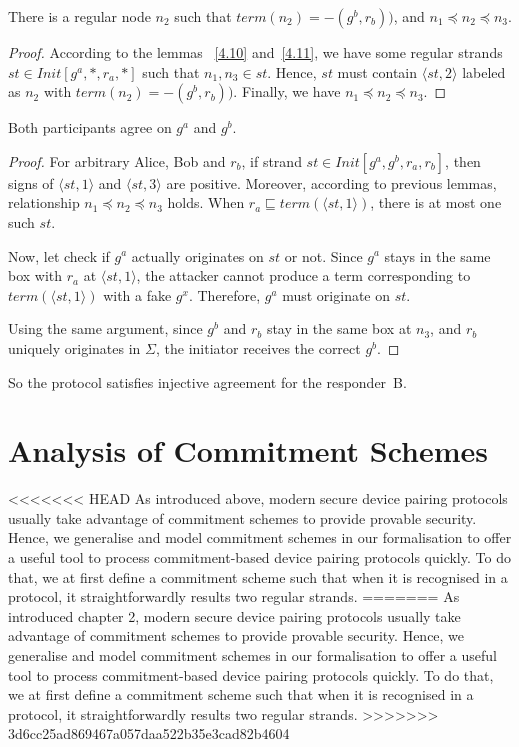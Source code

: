 \begin{itemize}
\begin{Lemma}\label{4.12}
There is a regular node $n_2$ such that $term(n_2)= -(g^b,r_b))$, and $n_1 \preceq n_2 \preceq n_3$.
\end{Lemma}

\begin{proof}
According to the lemmas ~\ref{4.10} and~\ref{4.11}, we have some regular strands $st \in Init[g^a,*, r_a,*]$ such that $n_1, n_3 \in st$. 
Hence, $st$ must contain $\langle st,2 \rangle$ labeled as $n_2$ with $term(n_2)= -(g^b,r_b))$. Finally, we have $n_1 \preceq n_2 \preceq n_3$.
\end{proof}

\begin{Lemma}\label{lemme4.13}
Both participants agree on $g^a$ and $g^b$. 
\end{Lemma}

\begin{proof}
For arbitrary Alice, Bob and $r_b$, if strand $st \in Init[g^a,g^b,r_a,r_b]$, then signs of $\langle st,1 \rangle$ and $\langle st,3 \rangle$ are positive. Moreover, according to previous lemmas, relationship $n_1 \preceq n_2 \preceq n_3$ holds. When $r_a \sqsubseteq term(\langle st,1 \rangle )$, there is at most one such $st$.

Now, let check if $g^a$ actually originates on $st$ or not. Since $g^a$ stays in the same box with $r_a$ at $\langle st,1 \rangle$, the attacker cannot produce a term corresponding to $term(\langle st,1 \rangle )$ with a fake $g^{x}$. Therefore, $g^a$ must originate on $st$. 

Using the same argument, since $g^b$ and $r_b$ stay in the same box at $n_3$, and $r_b$ uniquely originates in $\Sigma$, the initiator receives the correct $g^b$.
\end{proof}

So the protocol satisfies injective agreement for the responder~B. 

\section{Analysis of Commitment Schemes}

<<<<<<< HEAD
As introduced above, modern secure device pairing protocols usually take advantage of commitment schemes to provide provable security. Hence, we generalise and model commitment schemes in our formalisation to offer a useful tool to process commitment-based device pairing protocols quickly. To do that, we at first define a commitment scheme such that when it is recognised in a protocol, it straightforwardly results two regular strands. 
=======
As introduced chapter 2, modern secure device pairing protocols usually take advantage of commitment schemes to provide provable security. Hence, we generalise and model commitment schemes in our formalisation to offer a useful tool to process commitment-based device pairing protocols quickly. To do that, we at first define a commitment scheme such that when it is recognised in a protocol, it straightforwardly results two regular strands. 
>>>>>>> 3d6cc25ad869467a057daa522b35e3cad82b4604


\end{itemize}
